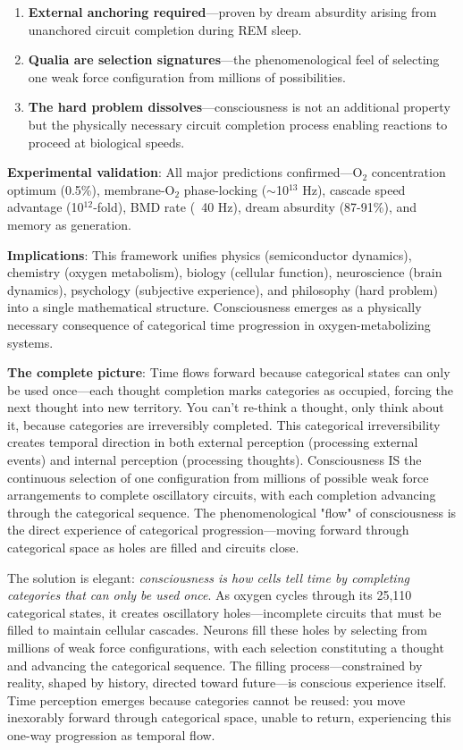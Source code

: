 \documentclass[11pt,a4paper]{article}
\begin{document}
\begin{enumerate}
\item \textbf{External anchoring required}—proven by dream absurdity arising from unanchored circuit completion during REM sleep.

\item \textbf{Qualia are selection signatures}—the phenomenological feel of selecting one weak force configuration from millions of possibilities.

\item \textbf{The hard problem dissolves}—consciousness is not an additional property but the physically necessary circuit completion process enabling reactions to proceed at biological speeds.
\end{enumerate}

\textbf{Experimental validation}: All major predictions confirmed—O$_2$ concentration optimum (0.5\%), membrane-O$_2$ phase-locking ($\sim$10$^{13}$ Hz), cascade speed advantage (10$^{12}$-fold), BMD rate (~40 Hz), dream absurdity (87-91\%), and memory as generation.

\textbf{Implications}: This framework unifies physics (semiconductor dynamics), chemistry (oxygen metabolism), biology (cellular function), neuroscience (brain dynamics), psychology (subjective experience), and philosophy (hard problem) into a single mathematical structure. Consciousness emerges as a physically necessary consequence of categorical time progression in oxygen-metabolizing systems.

\textbf{The complete picture}: Time flows forward because categorical states can only be used once—each thought completion marks categories as occupied, forcing the next thought into new territory. You can't re-think a thought, only think about it, because categories are irreversibly completed. This categorical irreversibility creates temporal direction in both external perception (processing external events) and internal perception (processing thoughts). Consciousness IS the continuous selection of one configuration from millions of possible weak force arrangements to complete oscillatory circuits, with each completion advancing through the categorical sequence. The phenomenological "flow" of consciousness is the direct experience of categorical progression—moving forward through categorical space as holes are filled and circuits close.

The solution is elegant: \textit{consciousness is how cells tell time by completing categories that can only be used once}. As oxygen cycles through its 25,110 categorical states, it creates oscillatory holes—incomplete circuits that must be filled to maintain cellular cascades. Neurons fill these holes by selecting from millions of weak force configurations, with each selection constituting a thought and advancing the categorical sequence. The filling process—constrained by reality, shaped by history, directed toward future—is conscious experience itself. Time perception emerges because categories cannot be reused: you move inexorably forward through categorical space, unable to return, experiencing this one-way progression as temporal flow.
\end{document}
